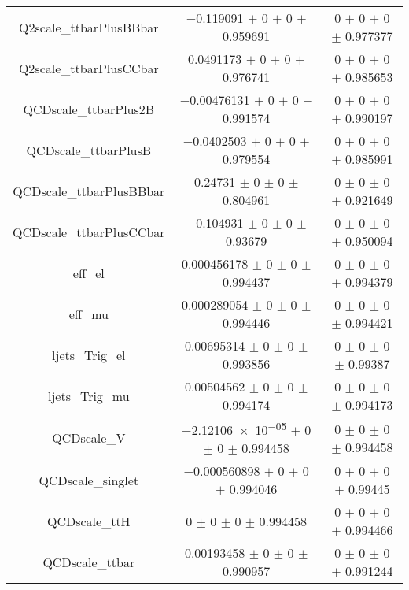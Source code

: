 \begin{table}
\begin{tabular}{ccc}
Q2scale\_ttbarPlusBBbar & \num{-0.119091} $\pm$ \num{0} $\pm$ \num{0} $\pm$ \num{0.959691} & \num{0} $\pm$ \num{0} $\pm$ \num{0} $\pm$ \num{0.977377}\\
Q2scale\_ttbarPlusCCbar & \num{0.0491173} $\pm$ \num{0} $\pm$ \num{0} $\pm$ \num{0.976741} & \num{0} $\pm$ \num{0} $\pm$ \num{0} $\pm$ \num{0.985653}\\
QCDscale\_ttbarPlus2B & \num{-0.00476131} $\pm$ \num{0} $\pm$ \num{0} $\pm$ \num{0.991574} & \num{0} $\pm$ \num{0} $\pm$ \num{0} $\pm$ \num{0.990197}\\
QCDscale\_ttbarPlusB & \num{-0.0402503} $\pm$ \num{0} $\pm$ \num{0} $\pm$ \num{0.979554} & \num{0} $\pm$ \num{0} $\pm$ \num{0} $\pm$ \num{0.985991}\\
QCDscale\_ttbarPlusBBbar & \num{0.24731} $\pm$ \num{0} $\pm$ \num{0} $\pm$ \num{0.804961} & \num{0} $\pm$ \num{0} $\pm$ \num{0} $\pm$ \num{0.921649}\\
QCDscale\_ttbarPlusCCbar & \num{-0.104931} $\pm$ \num{0} $\pm$ \num{0} $\pm$ \num{0.93679} & \num{0} $\pm$ \num{0} $\pm$ \num{0} $\pm$ \num{0.950094}\\
eff\_el & \num{0.000456178} $\pm$ \num{0} $\pm$ \num{0} $\pm$ \num{0.994437} & \num{0} $\pm$ \num{0} $\pm$ \num{0} $\pm$ \num{0.994379}\\
eff\_mu & \num{0.000289054} $\pm$ \num{0} $\pm$ \num{0} $\pm$ \num{0.994446} & \num{0} $\pm$ \num{0} $\pm$ \num{0} $\pm$ \num{0.994421}\\
ljets\_Trig\_el & \num{0.00695314} $\pm$ \num{0} $\pm$ \num{0} $\pm$ \num{0.993856} & \num{0} $\pm$ \num{0} $\pm$ \num{0} $\pm$ \num{0.99387}\\
ljets\_Trig\_mu & \num{0.00504562} $\pm$ \num{0} $\pm$ \num{0} $\pm$ \num{0.994174} & \num{0} $\pm$ \num{0} $\pm$ \num{0} $\pm$ \num{0.994173}\\
QCDscale\_V & \num{-2.12106e-05} $\pm$ \num{0} $\pm$ \num{0} $\pm$ \num{0.994458} & \num{0} $\pm$ \num{0} $\pm$ \num{0} $\pm$ \num{0.994458}\\
QCDscale\_singlet & \num{-0.000560898} $\pm$ \num{0} $\pm$ \num{0} $\pm$ \num{0.994046} & \num{0} $\pm$ \num{0} $\pm$ \num{0} $\pm$ \num{0.99445}\\
QCDscale\_ttH & \num{0} $\pm$ \num{0} $\pm$ \num{0} $\pm$ \num{0.994458} & \num{0} $\pm$ \num{0} $\pm$ \num{0} $\pm$ \num{0.994466}\\
QCDscale\_ttbar & \num{0.00193458} $\pm$ \num{0} $\pm$ \num{0} $\pm$ \num{0.990957} & \num{0} $\pm$ \num{0} $\pm$ \num{0} $\pm$ \num{0.991244}\\

\end{tabular}
\end{table}
